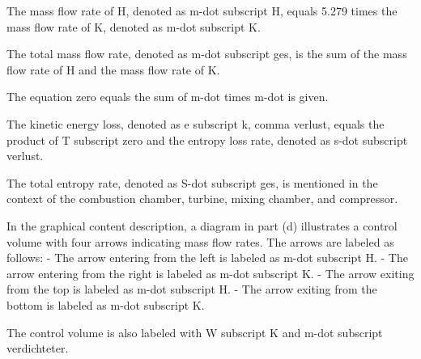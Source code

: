 The mass flow rate of H, denoted as m-dot subscript H, equals 5.279 times the mass flow rate of K, denoted as m-dot subscript K.

The total mass flow rate, denoted as m-dot subscript ges, is the sum of the mass flow rate of H and the mass flow rate of K.

The equation zero equals the sum of m-dot times m-dot is given.

The kinetic energy loss, denoted as e subscript k, comma verlust, equals the product of T subscript zero and the entropy loss rate, denoted as s-dot subscript verlust.

The total entropy rate, denoted as S-dot subscript ges, is mentioned in the context of the combustion chamber, turbine, mixing chamber, and compressor.

In the graphical content description, a diagram in part (d) illustrates a control volume with four arrows indicating mass flow rates. The arrows are labeled as follows:
- The arrow entering from the left is labeled as m-dot subscript H.
- The arrow entering from the right is labeled as m-dot subscript K.
- The arrow exiting from the top is labeled as m-dot subscript H.
- The arrow exiting from the bottom is labeled as m-dot subscript K.

The control volume is also labeled with W subscript K and m-dot subscript verdichteter.